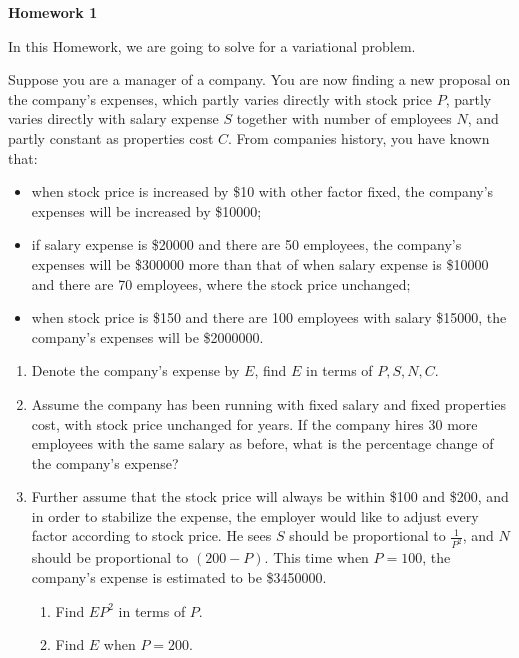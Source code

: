 \documentclass[12pt]{article}
\begin{document}
    \begin{center}
        \textbf{Homework 1}
    \end{center}

    In this Homework, we are going to solve for a variational problem.

    Suppose you are a manager of a company. You are now finding a new proposal on the company's expenses, which partly varies directly with stock price $P$, partly varies directly with salary expense $S$ together with number of employees $N$, and partly constant as properties cost $C$. From companies history, you have known that:\begin{itemize}
        \item when stock price is increased by \$10 with other factor fixed, the company's expenses will be increased by \$10000;
        \item if salary expense is \$20000 and there are 50 employees, the company's expenses will be \$300000 more than that of when salary expense is \$10000 and there are 70 employees, where the stock price unchanged;
        \item when stock price is \$150 and there are 100 employees with salary \$15000, the company's expenses will be \$2000000.
    \end{itemize}

    \begin{enumerate}
        \item Denote the company's expense by $E$, find $E$ in terms of $P,S,N,C$.
        \item Assume the company has been running with fixed salary and fixed properties cost, with stock price unchanged for years. If the company hires 30 more employees with the same salary as before, what is the percentage change of the company's expense?
        \item Further assume that the stock price will always be within \$100 and \$200, and in order to stabilize the expense, the employer would like to adjust every factor according to stock price. He sees $S$ should be proportional to $\frac{1}{P^2}$, and $N$ should be proportional to $(200-P)$. This time when $P=100$, the company's expense is estimated to be \$3450000.\begin{enumerate}
            \item Find $EP^2$ in terms of $P$.
            \item Find $E$ when $P=200$.
        \end{enumerate}
    \end{enumerate}
\end{document}
